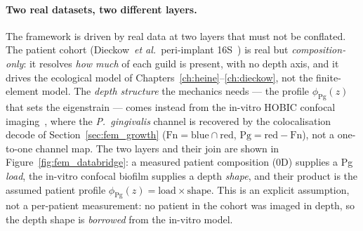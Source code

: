 %
%

\paragraph{Two real datasets, two different layers.} The framework is driven by real
data at two layers that must not be conflated. The patient cohort
(Dieckow~\textit{et al.}~peri-implant 16S~\cite{dieckow2024}) is real but
\emph{composition-only}: it resolves \emph{how much} of each guild is present, with no
depth axis, and it drives the ecological model of Chapters~\ref{ch:heine}--\ref{ch:dieckow},
not the finite-element model. The \emph{depth structure} the mechanics needs --- the
profile $\phi_\mathrm{Pg}(z)$ that sets the eigenstrain --- comes instead from the
in-vitro HOBIC confocal imaging~\cite{Heine2025PeriImplant}, where the
\textit{P.~gingivalis} channel is recovered by the colocalisation decode of
Section~\ref{sec:fem_growth} ($\mathrm{Fn}=\mathrm{blue}\cap\mathrm{red}$,
$\mathrm{Pg}=\mathrm{red}-\mathrm{Fn}$), not a one-to-one channel map. The two layers and
their join are shown in Figure~\ref{fig:fem_databridge}: a measured patient composition
(0D) supplies a Pg \emph{load}, the in-vitro confocal biofilm supplies a depth
\emph{shape}, and their product is the assumed patient profile
$\phi_\mathrm{Pg}(z)=\text{load}\times\text{shape}$. This is an explicit assumption, not a
per-patient measurement: no patient in the cohort was imaged in depth, so the depth shape
is \emph{borrowed} from the in-vitro model.

